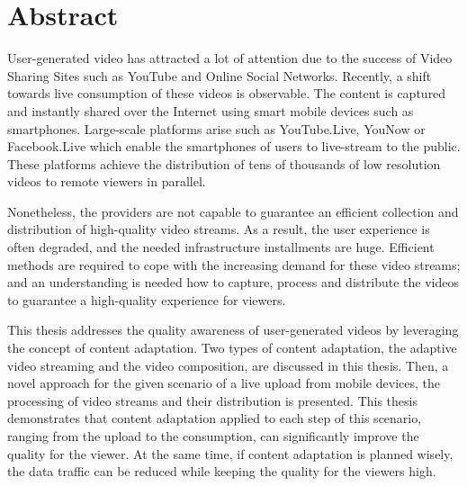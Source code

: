 \chapter*{Abstract}
\thispagestyle{empty}
	User-generated video has attracted a lot of attention due to the success of Video Sharing Sites such as YouTube and Online Social Networks.
	Recently, a shift towards live consumption of these videos is observable. The content is captured and instantly shared over the Internet using smart mobile devices such as smartphones.
	Large-scale platforms arise such as YouTube.Live, YouNow or Facebook.Live which enable the smartphones of users to live-stream to the public.
	These platforms achieve the distribution of tens of thousands of low resolution videos to remote viewers in parallel.
	
	Nonetheless, the providers are not capable to guarantee an efficient collection and distribution of high-quality video streams.
	As a result, the user experience is often degraded, and the needed infrastructure installments are huge.
	Efficient methods are required to cope with the increasing demand for these video streams; and an understanding is needed how to capture, process and distribute the videos to guarantee a high-quality experience for viewers.
	
	This thesis addresses the quality awareness of user-generated videos by leveraging the concept of content adaptation.
	Two types of content adaptation, the adaptive video streaming and the video composition, are discussed in this thesis.
	Then, a novel approach for the given scenario of a live upload from mobile devices, the processing of video streams and their distribution is presented.
	This thesis demonstrates that content adaptation applied to each step of this scenario, ranging from the upload to the consumption, can significantly improve the quality for the viewer.
	At the same time, if content adaptation is planned wisely, the data traffic can be reduced while keeping the quality for the viewers high.
	

